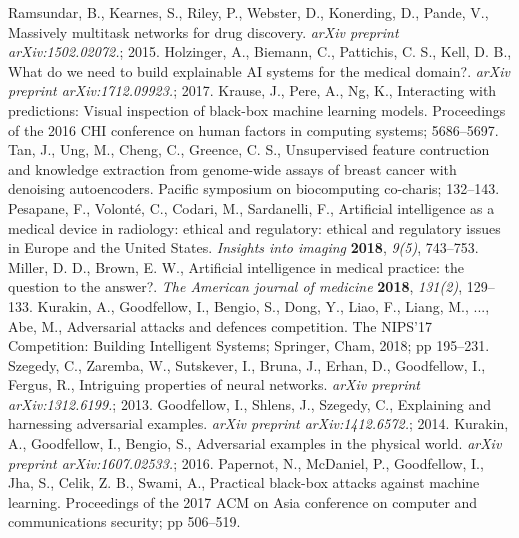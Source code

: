 \documentclass[journal,article,submit,moreauthors,pdftex]{Definitions/mdpi}
\begin{document}
\begin{thebibliography}{999}
Ramsundar, B., Kearnes, S., Riley, P., Webster, D., Konerding, D., Pande, V., Massively multitask networks for drug discovery. \textit{arXiv preprint arXiv:1502.02072.}; 2015.
Holzinger, A., Biemann, C., Pattichis, C. S., Kell, D. B., What do we need to build explainable AI systems for the medical domain?. \textit{arXiv preprint arXiv:1712.09923.}; 2017.
Krause, J., Pere, A., Ng, K., Interacting with predictions: Visual inspection of black-box machine learning models. Proceedings of the 2016 CHI conference on human factors in computing systems; 5686--5697.
Tan, J., Ung, M., Cheng, C., Greence, C. S., Unsupervised feature contruction and knowledge extraction from genome-wide assays of breast cancer with denoising autoencoders. Pacific symposium on biocomputing co-charis; 132--143.
Pesapane, F., Volonté, C., Codari, M., Sardanelli, F., Artificial intelligence as a medical device in radiology: ethical and regulatory: ethical and regulatory issues in Europe and the United States. {\em Insights into imaging} {\bf 2018}, {\em 9(5)}, 743--753.
Miller, D. D., Brown, E. W., Artificial intelligence in medical practice: the question to the answer?. {\em The American journal of medicine} {\bf 2018}, {\em 131(2)}, 129--133.
Kurakin, A., Goodfellow, I., Bengio, S., Dong, Y., Liao, F., Liang, M., ..., Abe, M., Adversarial attacks and defences competition. The NIPS'17 Competition: Building Intelligent Systems; Springer, Cham, 2018; pp 195--231.
Szegedy, C., Zaremba, W., Sutskever, I., Bruna, J., Erhan, D., Goodfellow, I., Fergus, R., Intriguing properties of neural networks. \textit{arXiv preprint arXiv:1312.6199.}; 2013.
Goodfellow, I., Shlens, J., Szegedy, C., Explaining and harnessing adversarial examples. \textit{arXiv preprint arXiv:1412.6572.}; 2014.
Kurakin, A., Goodfellow, I., Bengio, S., Adversarial examples in the physical world. \textit{arXiv preprint arXiv:1607.02533.}; 2016.
Papernot, N., McDaniel, P., Goodfellow, I., Jha, S., Celik, Z. B., Swami, A., Practical black-box attacks against machine learning. Proceedings of the 2017 ACM on Asia conference on computer and communications security; pp 506--519.

\end{thebibliography}
\end{document}
